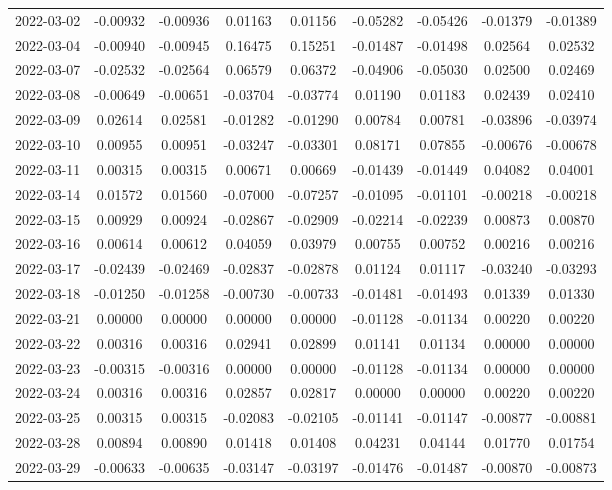 {\begin{footnotesize}
\begin{longtable}{lcccccccc}
2022-03-02 & -0.00932 & -0.00936 & 0.01163 & 0.01156 & -0.05282 & -0.05426 & -0.01379 & -0.01389 \\
2022-03-04 & -0.00940 & -0.00945 & 0.16475 & 0.15251 & -0.01487 & -0.01498 & 0.02564 & 0.02532 \\
2022-03-07 & -0.02532 & -0.02564 & 0.06579 & 0.06372 & -0.04906 & -0.05030 & 0.02500 & 0.02469 \\
2022-03-08 & -0.00649 & -0.00651 & -0.03704 & -0.03774 & 0.01190 & 0.01183 & 0.02439 & 0.02410 \\
2022-03-09 & 0.02614 & 0.02581 & -0.01282 & -0.01290 & 0.00784 & 0.00781 & -0.03896 & -0.03974 \\
2022-03-10 & 0.00955 & 0.00951 & -0.03247 & -0.03301 & 0.08171 & 0.07855 & -0.00676 & -0.00678 \\
2022-03-11 & 0.00315 & 0.00315 & 0.00671 & 0.00669 & -0.01439 & -0.01449 & 0.04082 & 0.04001 \\
2022-03-14 & 0.01572 & 0.01560 & -0.07000 & -0.07257 & -0.01095 & -0.01101 & -0.00218 & -0.00218 \\
2022-03-15 & 0.00929 & 0.00924 & -0.02867 & -0.02909 & -0.02214 & -0.02239 & 0.00873 & 0.00870 \\
2022-03-16 & 0.00614 & 0.00612 & 0.04059 & 0.03979 & 0.00755 & 0.00752 & 0.00216 & 0.00216 \\
2022-03-17 & -0.02439 & -0.02469 & -0.02837 & -0.02878 & 0.01124 & 0.01117 & -0.03240 & -0.03293 \\
2022-03-18 & -0.01250 & -0.01258 & -0.00730 & -0.00733 & -0.01481 & -0.01493 & 0.01339 & 0.01330 \\
2022-03-21 & 0.00000 & 0.00000 & 0.00000 & 0.00000 & -0.01128 & -0.01134 & 0.00220 & 0.00220 \\
2022-03-22 & 0.00316 & 0.00316 & 0.02941 & 0.02899 & 0.01141 & 0.01134 & 0.00000 & 0.00000 \\
2022-03-23 & -0.00315 & -0.00316 & 0.00000 & 0.00000 & -0.01128 & -0.01134 & 0.00000 & 0.00000 \\
2022-03-24 & 0.00316 & 0.00316 & 0.02857 & 0.02817 & 0.00000 & 0.00000 & 0.00220 & 0.00220 \\
2022-03-25 & 0.00315 & 0.00315 & -0.02083 & -0.02105 & -0.01141 & -0.01147 & -0.00877 & -0.00881 \\
2022-03-28 & 0.00894 & 0.00890 & 0.01418 & 0.01408 & 0.04231 & 0.04144 & 0.01770 & 0.01754 \\
2022-03-29 & -0.00633 & -0.00635 & -0.03147 & -0.03197 & -0.01476 & -0.01487 & -0.00870 & -0.00873 \\

\end{longtable}
\end{footnotesize}}
